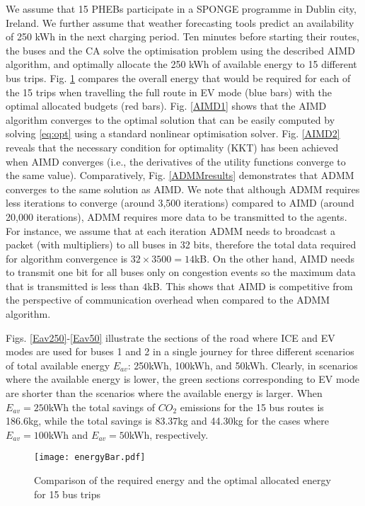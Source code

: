 \documentclass[journal]{IEEEtran}
\begin{document}
We assume that 15 PHEBs participate in a SPONGE programme in Dublin city, Ireland. We further assume that weather forecasting tools predict an availability of 250 kWh in the next charging period. Ten minutes before starting their routes, the buses and the CA solve the optimisation problem using the described AIMD algorithm, and optimally allocate the 250 kWh of available energy to 15 different bus trips. Fig. \ref{total_energy} compares the overall energy that would be required for each of the 15 trips when travelling the full route in EV mode (blue bars) with the optimal allocated budgets (red bars). Fig. \ref{AIMD1} shows that the AIMD algorithm converges to the optimal solution that can be easily computed by solving \eqref{eq:opt} using a standard nonlinear optimisation solver. Fig. \ref{AIMD2} reveals that the necessary condition for optimality (KKT) has been achieved when AIMD converges (i.e., the derivatives of the utility functions converge to the same value). Comparatively, Fig. \ref{ADMMresults} demonstrates that ADMM converges to the same solution as AIMD. We note that although ADMM requires less iterations to converge (around 3,500 iterations) compared to AIMD (around 20,000 iterations), ADMM requires more data to be transmitted to the agents. For instance, we assume that at each iteration ADMM needs to broadcast a packet (with multipliers) to all buses in 32 bits, therefore the total data required for algorithm convergence is $32 \times 3500 = 14$kB. On the other hand, AIMD needs to transmit one bit for all buses only on congestion events so the maximum data that is transmitted is less than $4$kB. This shows that AIMD is competitive from the perspective of communication overhead when compared to the ADMM algorithm.   


Figs. \ref{Eav250}-\ref{Eav50} illustrate the sections of the road where ICE and EV modes are used for buses 1 and 2 in a single journey for three different scenarios of total available energy $E_{av}$: 250kWh, 100kWh, and 50kWh. Clearly, in scenarios where the available energy is lower, the green sections corresponding to EV mode are shorter than the scenarios where the available energy is larger. When $E_{av} =250$kWh the total savings of $CO_2$ emissions for the 15 bus routes is 186.6kg, while the total savings is 83.37kg and 44.30kg for the cases where $E_{av} = 100 $kWh and $E_{av} = 50 $kWh, respectively. 

\begin{figure}[htbp]
	\begin{center}
		\hspace{-0.1cm}
		{\texttt{[image: energyBar.pdf]}}
		\caption{Comparison of the required energy and the optimal allocated energy for 15 bus trips}
		\label{total_energy}
	\end{center}
\end{figure}
\end{document}

